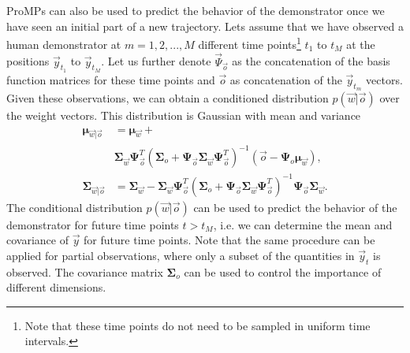 ProMPs can also be used to predict the behavior of the demonstrator once we have seen an initial part of a new trajectory. 
Lets assume that we have observed a human demonstrator at $m=1,2, ..., M$ different time points\footnote{Note that these time points do not need to be sampled in uniform time intervals.} 
$t_1$ to $t_M$ at the positions $\vec y_{t_1}$ to $\vec y_{t_M}$. 
Let us further denote $\vec \Psi_{\vec o}$ as the concatenation of the basis function matrices for these time points 
and $\vec o$ as concatenation of the $\vec y_{t_m}$ vectors. 
Given these observations,
we can obtain a conditioned distribution $p(\vec w| \vec o)$ over the weight vectors. 
This distribution is Gaussian with mean and variance
\begin{align}
\boldsymbol{\mu}_{\vec w| \vec o} & =  \boldsymbol{\mu}_{\vec w} + \nonumber \\ 
                                  & \boldsymbol{\Sigma}_{\vec w}\boldsymbol{\Psi}_{\vec o}^T\left(\boldsymbol{\Sigma}_o + \boldsymbol{\Psi}_{\vec o}\boldsymbol{\Sigma}_{\vec w}\boldsymbol{\Psi}_{\vec o}^T\right)^{-1}\left(\vec o -\boldsymbol{\Psi}_{o}\boldsymbol{\mu}_{\vec w}\right),  \label{eq:conditioningProMP1}\\
\boldsymbol{\Sigma}_{\vec w|\vec o} & =  \boldsymbol{\Sigma}_{\vec w}-\boldsymbol{\Sigma}_{\vec w}\boldsymbol{\Psi}_{\vec o}^T\left(\boldsymbol{\Sigma}_o +\boldsymbol{\Psi}_{\vec o}\boldsymbol{\Sigma}_{\vec w}\boldsymbol{\Psi}_{\vec o}^T\right)^{-1}\boldsymbol{\Psi}_{\vec o} \boldsymbol{\Sigma}_{\vec w}. 
\label{eq:conditioningProMP2}
\end{align}
The conditional distribution  $p(\vec w| \vec o)$ can be used to predict the behavior of the demonstrator for future time points $t > t_M$, 
i.e. we can determine the mean and covariance of $\vec y$ for future time points. 
Note that the same procedure can be applied for partial observations, 
where only a subset of the quantities in $\vec y_t$ is observed. 
The covariance matrix $\boldsymbol{\Sigma}_o$ can be used to control the importance of different dimensions.

